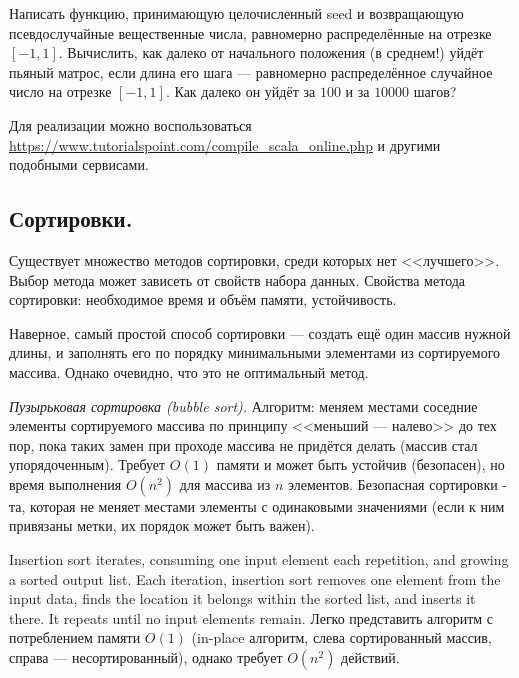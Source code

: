 \documentclass{book}
\begin{document}
Написать функцию, принимающую целочисленный seed и возвращающую псевдослучайные вещественные числа,
равномерно распределённые на отрезке $[-1,1]$. Вычислить, как далеко от начального положения (в
среднем!) уйдёт пьяный матрос, если длина его шага --- равномерно распределённое случайное число на
отрезке $[-1,1]$. Как далеко он уйдёт за $100$ и за $10000$ шагов?


Для реализации можно воспользоваться \url{https://www.tutorialspoint.com/compile_scala_online.php}
и другими подобными сервисами.

\subsection{Сортировки.}

Существует множество методов сортировки, среди которых нет <<лучшего>>. Выбор
метода может зависеть от свойств набора данных. Свойства метода сортировки:
необходимое время и объём памяти, устойчивость.

Наверное, самый простой способ сортировки --- создать ещё один массив нужной длины, и заполнять его
по порядку минимальными элементами из сортируемого массива. Однако очевидно, что это не оптимальный
метод.
 
\textit{Пузырьковая сортировка (bubble sort).} Алгоритм: меняем местами соседние элементы
сортируемого массива по принципу <<меньший --- налево>> до тех пор, пока таких
замен при проходе массива не придётся делать (массив стал упорядоченным).
Требует $O(1)$ памяти и может быть устойчив (безопасен), но время выполнения
$O(n^2)$ для массива из $n$ элементов. Безопасная сортировки - та, которая не меняет местами
элементы с одинаковыми значениями (если к ним привязаны метки, их порядок может быть важен).

Insertion sort iterates, consuming one input element each repetition, and growing a sorted output
list. Each iteration, insertion sort removes one element from the input data, finds the location
it belongs within the sorted list, and inserts it there. It repeats until no input elements
remain. Легко представить алгоритм с потреблением памяти $O(1)$ (in-place алгоритм, слева
сортированный массив, справа --- несортированный), однако требует $O(n^2)$ действий.
\end{document}
